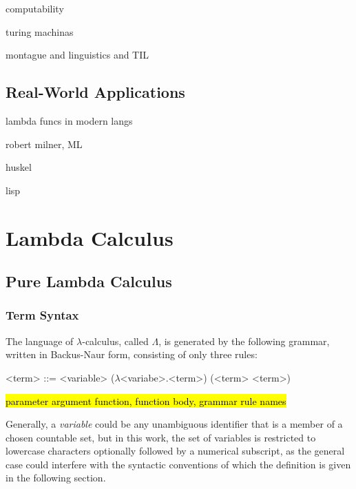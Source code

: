\documentclass[a4paper,10pt]{article}
\begin{document}
computability

turing machinas

montague and linguistics and TIL

\subsection{Real-World Applications}

lambda funcs in modern langs

robert milner, ML

huskel

lisp

\section{Lambda Calculus}
\subsection{Pure Lambda Calculus}

\subsubsection{Term Syntax}
The language of $\lambda$-calculus, called $\Lambda$, is generated by the following
grammar, written in Backus-Naur form, consisting of only three rules:
\setlength{\grammarindent}{5.2em}
\begin{grammar}
<term> ::= <variable> 
\alt ($\lambda$<variabe>.<term>) 
\alt (<term> <term>) 
\end{grammar}

\hl{parameter argument function, function body, grammar rule names }

Generally, a \textit{variable} could be any unambiguous identifier 
that is a member of a chosen countable set, but in this work, the set
of variables is restricted to
lowercase characters optionally followed by a numerical subscript,
as the general case could interfere with the syntactic conventions
of which the definition is given in the following section.
\end{document}
